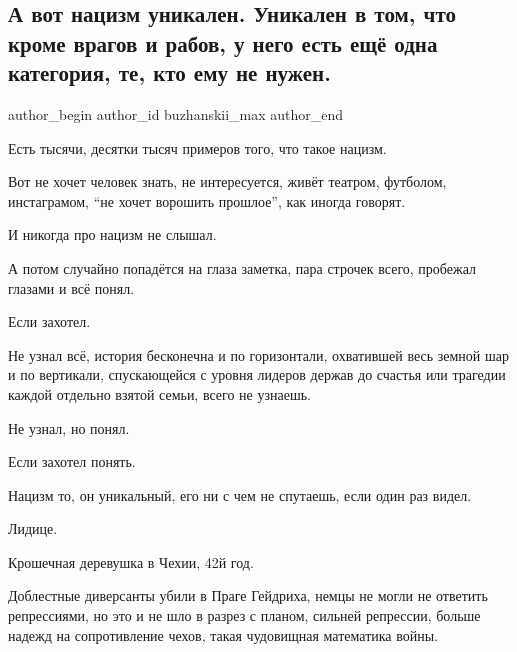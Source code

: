  
 
 
 
 
 
\subsection{А вот нацизм уникален. Уникален в том, что кроме врагов и рабов, у него есть ещё одна категория, те, кто ему не нужен.}
\label{sec:10_06_2021.fb.buzhanskii_max.1.nacizm_unikalnost}
\ifcmt
 author_begin
   author_id buzhanskii_max
 author_end
\fi

Есть тысячи, десятки тысяч примеров того, что такое нацизм.

Вот не хочет человек знать, не интересуется, живёт театром, футболом,
инстаграмом, \enquote{не хочет ворошить прошлое}, как иногда говорят.

И никогда про нацизм не слышал.

А потом случайно попадётся на глаза заметка, пара строчек всего, пробежал
глазами и всё понял.

Если захотел.

Не узнал всё, история бесконечна и по горизонтали, охватившей весь земной шар и
по вертикали, спускающейся с уровня лидеров держав до счастья или трагедии
каждой отдельно взятой семьи, всего не узнаешь.

Не узнал, но понял.

Если захотел понять.

Нацизм то, он уникальный, его ни с чем не спутаешь, если один раз видел.

Лидице.

Крошечная деревушка в Чехии, 42й год.

Доблестные диверсанты убили в Праге Гейдриха, немцы не могли не ответить
репрессиями, но это и не шло в разрез с планом, сильней репрессии, больше
надежд на сопротивление чехов, такая чудовищная математика войны.

